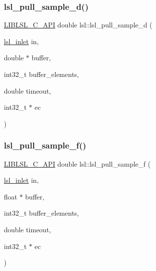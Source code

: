 \mbox{\label{namespacelsl_a958abfca3463aaf5703230b472e8e988}} 
\subsubsection{\texorpdfstring{lsl\+\_\+pull\+\_\+sample\+\_\+d()}{lsl\_pull\_sample\_d()}}
{\footnotesize\ttfamily \hyperlink{lsl__cpp_8h_aafd0ef1813e8be84a1420c4f1df64615}{L\+I\+B\+L\+S\+L\+\_\+\+C\+\_\+\+A\+PI} double lsl\+::lsl\+\_\+pull\+\_\+sample\+\_\+d (\begin{DoxyParamCaption}\item[{\hyperlink{namespacelsl_a884a3363cfcba75d7ce8f00c1c4c54f1}{lsl\+\_\+inlet}}]{in,  }\item[{double $\ast$}]{buffer,  }\item[{int32\+\_\+t}]{buffer\+\_\+elements,  }\item[{double}]{timeout,  }\item[{int32\+\_\+t $\ast$}]{ec }\end{DoxyParamCaption})}

\mbox{\label{namespacelsl_a56fc49301c94b76f1c89ab041d26bef1}} 
\subsubsection{\texorpdfstring{lsl\+\_\+pull\+\_\+sample\+\_\+f()}{lsl\_pull\_sample\_f()}}
{\footnotesize\ttfamily \hyperlink{lsl__cpp_8h_aafd0ef1813e8be84a1420c4f1df64615}{L\+I\+B\+L\+S\+L\+\_\+\+C\+\_\+\+A\+PI} double lsl\+::lsl\+\_\+pull\+\_\+sample\+\_\+f (\begin{DoxyParamCaption}\item[{\hyperlink{namespacelsl_a884a3363cfcba75d7ce8f00c1c4c54f1}{lsl\+\_\+inlet}}]{in,  }\item[{float $\ast$}]{buffer,  }\item[{int32\+\_\+t}]{buffer\+\_\+elements,  }\item[{double}]{timeout,  }\item[{int32\+\_\+t $\ast$}]{ec }\end{DoxyParamCaption})}

